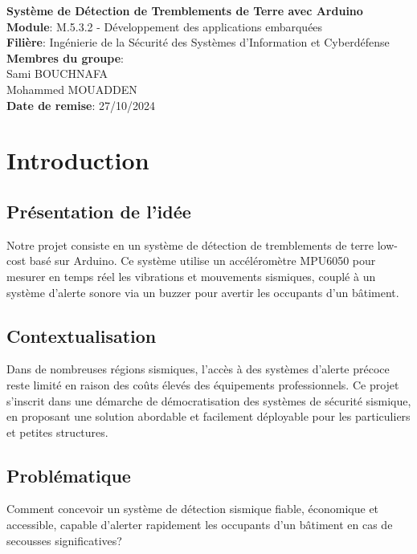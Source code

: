 \documentclass[12pt,a4paper]{article}
\begin{document}
\begin{titlepage}
\begin{center}
\vspace*{2cm}
{\Large\textbf{Système de Détection de Tremblements de Terre avec Arduino}}\\[2cm]

\textbf{Module}: M.5.3.2 - Développement des applications embarquées\\[0.5cm]
\textbf{Filière}: Ingénierie de la Sécurité des Systèmes d’Information et Cyberdéfense\\[2cm]

\textbf{Membres du groupe}:\\
Sami BOUCHNAFA \\
Mohammed MOUADDEN\\[2cm]

\textbf{Date de remise}: 27/10/2024\\[4cm]

\end{center}
\end{titlepage}

\tableofcontents
\newpage

\section{Introduction}
\subsection{Présentation de l'idée}
Notre projet consiste en un système de détection de tremblements de terre low-cost basé sur Arduino. Ce système utilise un accéléromètre MPU6050 pour mesurer en temps réel les vibrations et mouvements sismiques, couplé à un système d'alerte sonore via un buzzer pour avertir les occupants d'un bâtiment.

\subsection{Contextualisation}
Dans de nombreuses régions sismiques, l'accès à des systèmes d'alerte précoce reste limité en raison des coûts élevés des équipements professionnels. Ce projet s'inscrit dans une démarche de démocratisation des systèmes de sécurité sismique, en proposant une solution abordable et facilement déployable pour les particuliers et petites structures.

\subsection{Problématique}
Comment concevoir un système de détection sismique fiable, économique et accessible, capable d'alerter rapidement les occupants d'un bâtiment en cas de secousses significatives?
\end{document}
